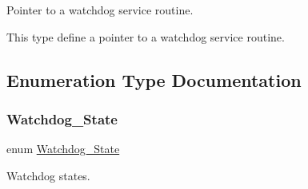 Pointer to a watchdog service routine. 

This type define a pointer to a watchdog service routine. 

\subsection{Enumeration Type Documentation}
\mbox{\label{group__RTEMSScoreWatchdog_ga05e885fccc21abb152cc73f29640c679}} 
\subsubsection{\texorpdfstring{Watchdog\_State}{Watchdog\_State}}
{\footnotesize\ttfamily enum \mbox{\hyperlink{group__RTEMSScoreWatchdog_ga05e885fccc21abb152cc73f29640c679}{Watchdog\+\_\+\+State}}}



Watchdog states. 

